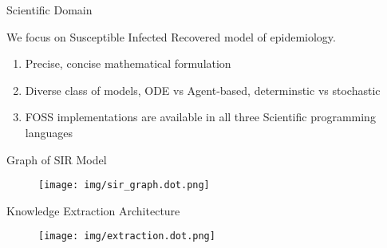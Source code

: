 \documentclass[ignorenonframetext,]{beamer}
\providecommand{\tightlist}{%
  \setlength{\itemsep}{0pt}\setlength{\parskip}{0pt}}
\begin{document}
\begin{frame}{Scientific Domain}
\protect\hypertarget{scientific-domain}{}

We focus on Susceptible Infected Recovered model of epidemiology.

\begin{enumerate}
\tightlist
\item
  Precise, concise mathematical formulation
\item
  Diverse class of models, ODE vs Agent-based, determinstic vs
  stochastic
\item
  FOSS implementations are available in all three Scientific programming
  languages
\end{enumerate}

\end{frame}

\begin{frame}{Graph of SIR Model}
\protect\hypertarget{graph-of-sir-model}{}

\begin{figure}
\centering
\texttt{[image: img/sir\_graph.dot.png]}
\end{figure}

\end{frame}

\begin{frame}{Knowledge Extraction Architecture}
\protect\hypertarget{knowledge-extraction-architecture}{}

\begin{figure}
\centering
\texttt{[image: img/extraction.dot.png]}
\end{figure}

\end{frame}
\end{document}

